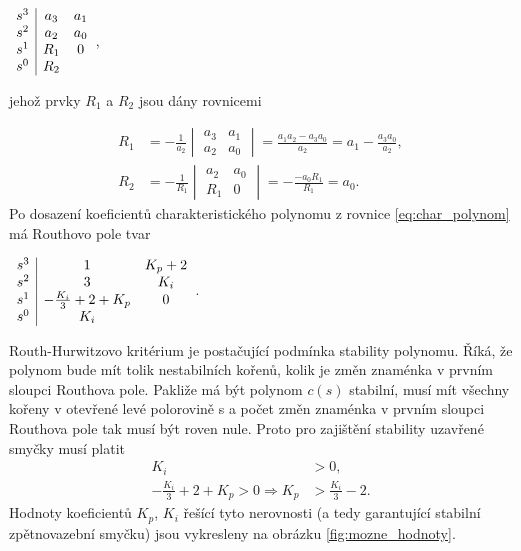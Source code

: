 \documentclass[twoside]{article}
\begin{document}
\begin{centering}
	$\begin{array}{c|cc}
		\centering
		s^3 & a_3 & a_1 \\
		s^2 & a_2 & a_0 \\
		s^1 & R_1  & 0 \\
		s^0 & R_2  &  \\
	\end{array}$, \\ 
\end{centering}

jehož prvky $R_1$ a $R_2$ jsou dány rovnicemi

\begin{equation}
	\begin{split}
		R_1 &= -\frac{1}{a_2} \begin{vmatrix*}
			a_3 & a_1 \\
			a_2 & a_0
		\end{vmatrix*} = \frac{a_1 a_2- a_3 a_0}{a_2} = a_1 -\frac{a_3 a_0}{a_2},\\
		R_2 &= - \frac{1}{R_1} \begin{vmatrix*}
			a_2 & a_0 \\
			R_1 & 0
		\end{vmatrix*} = -\frac{-a_0 R_1}{R_1} = a_0.
	\end{split}
\end{equation}
\newpage
Po dosazení koeficientů charakteristického polynomu z rovnice \eqref{eq:char_polynom} má Routhovo pole tvar 

\begin{centering}
	$\begin{array}{c|cc}
		\centering
		s^3 & 1 & K_p + 2 \\
		s^2 & 3 & K_i \\
		s^1 & -\frac{K_i}{3} + 2 + K_p & 0 \\
		s^0 & K_i &  \\
	\end{array}$. \\
\end{centering}

Routh-Hurwitzovo kritérium je postačující podmínka stability polynomu. Říká, že polynom bude mít tolik nestabilních kořenů, kolik je změn znaménka
v prvním sloupci Routhova pole. Pakliže má být polynom $c(s)$ stabilní, musí mít všechny kořeny v otevřené levé polorovině s a počet změn znaménka v prvním sloupci
Routhova pole tak musí být roven nule. Proto pro zajištění stability uzavřené smyčky musí platit
\begin{equation}
	\begin{split}
		K_i &> 0, \\
		-\frac{K_i}{3} + 2 + K_p > 0 \Rightarrow K_p &> \frac{K_i}{3} - 2.
	\end{split}
\end{equation}
Hodnoty koeficientů $K_p$, $K_i$ řešící tyto nerovnosti (a tedy garantující stabilní zpětnovazební smyčku) jsou vykresleny na obrázku \ref{fig:mozne_hodnoty}.
\end{document}
